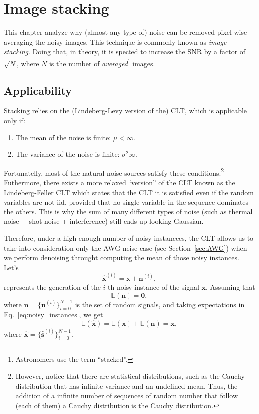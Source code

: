 \chapter{Image stacking}
This chapter analyze why (almost any type of) noise can be removed
pixel-wise averaging the noisy images. This technique is commonly
known as \emph{image stacking}. Doing that, in theory, it is spected
to increase the \gls{SNR} by a factor of $\sqrt{N}$, where $N$ is the
number of \emph{averaged}\footnote{Astronomers use the term
  ``stacked''.} images.

\section{Applicability}

Stacking relies on the (Lindeberg-Levy version of the) \gls{CLT},
which is applicable only if:
\begin{enumerate}
\item The mean of the noise is finite: $\mu<\infty$.
\item The variance of the noise is finite: $\sigma^2\infty$.
\end{enumerate}
Fortunatelly, most of the natural noise sources satisfy these
conditions.\footnote{However, notice that there are statistical
  distributions, such as the Cauchy distribution that has infinite
  variance and an undefined mean. Thus, the addition of a infinite
  number of sequences of random number that follow (each of them) a
  Cauchy distribution is the Cauchy distribution.} Futhermore, there
exists a more relaxed ``version'' of the \gls{CLT} known as the
Lindeberg-Feller \gls{CLT} which states that the \gls{CLT} it is
satisfied even if the random variables are not \gls{iid}, provided
that no single variable in the sequence dominates the others. This is
why the sum of many different types of noise (such as thermal noise +
shot noise + interference) still ends up looking Gaussian.

Therefore, under a high enough number of noisy instancces, the
\gls{CLT} allows us to take into consideration only the \gls{AWG}
noise case (see Section~\ref{sec:AWG}) when we perform denoising
throught computing the mean of those noisy instances. Let's
\begin{equation}
  \hat{\bm{x}}^{(i)} = \bm{x} + \bm{n}^{(i)},
  \label{eq:noisy_instances}
\end{equation}
represents the generation of the $i$-th noisy instance of the signal
$\bm{x}$. Assuming that
\begin{equation}
  \mathbb{E}(\bm{n})=\bm{0},
\end{equation}
where $\bm{n}=\{\bm{n}^{(i)}\}_{i=0}^{N-1}$ is the set of
random signals, and taking expectations in
Eq.~\ref{eq:noisy_instances}, we get
\begin{equation}
  \mathbb{E}(\hat{\bm{x}}) = \mathbb{E}(\bm{x}) + \mathbb{E}(\bm{n}) = \bm{x},
  \label{eq:MNI}
\end{equation}
where $\hat{\bm{x}}=\{\hat{\bm{s}}^{(i)}\}_{i=0}^{N-1}$.

